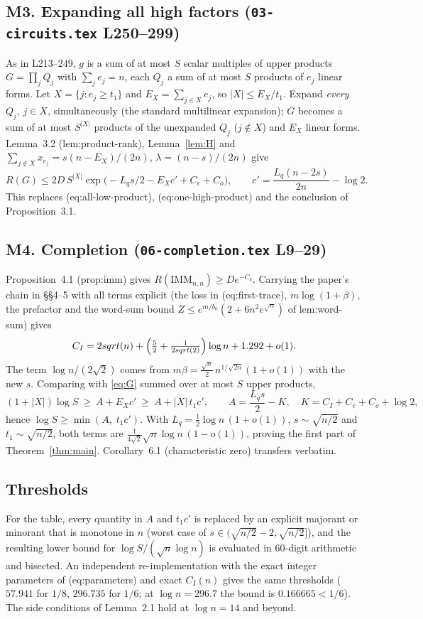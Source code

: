 \documentclass[10pt]{amsart}
\theoremstyle{remark}
\newcommand{\IMM}{\mathrm{IMM}}
\begin{document}
\subsection*{M3. Expanding all high factors (\texttt{03-circuits.tex} L250--299)}
As in L213--249, $g$ is a sum of at most $S$ scalar multiples of upper products
$G=\prod_jQ_j$ with $\sum_je_j=n$, each $Q_j$ a sum of at most $S$ products of $e_j$ linear
forms. Let $X=\{j:e_j\ge t_1\}$ and $E_X=\sum_{j\in X}e_j$, so $|X|\le E_X/t_1$. Expand
\emph{every} $Q_j$, $j\in X$, simultaneously (the standard multilinear expansion); $G$
becomes a sum of at most $S^{|X|}$ products of the unexpanded $Q_j$ ($j\notin X$) and $E_X$
linear forms. Lemma~3.2 (lem:product-rank), Lemma~\ref{lem:H} and
$\sum_{j\notin X}x_{e_j}=s(n-E_X)/(2n)$, $\lambda=(n-s)/(2n)$ give
\begin{equation}\label{eq:G}
R(G)\le 2D\,S^{|X|}\exp\bigl(-L_q s/2-E_X c'+C_e+C_o\bigr),\qquad
c'=\frac{L_q(n-2s)}{2n}-\log2 .
\end{equation}
This replaces (eq:all-low-product), (eq:one-high-product) and the conclusion of
Proposition~3.1.

\subsection*{M4. Completion (\texttt{06-completion.tex} L9--29)}
Proposition~4.1 (prop:imm) gives $R(\IMM_{n,n})\ge D e^{-C_I}$. Carrying the paper's
chain in \S\S4--5 with all terms explicit (the loss in (eq:first-trace), $m\log(1+\beta)$,
the prefactor and the word-sum bound $Z\le e^{m/b_0}(2+6n^2e^{\sqrt n})$ of
lem:word-sum) gives
\[
C_I=2\sqrt n+\Bigl(\tfrac52+\tfrac1{2\sqrt2}\Bigr)\log n+1.292+o(1).
\]
The term $\log n/(2\sqrt2)$ comes from $m\beta=\tfrac{\sqrt n}{2}\,n^{1/\sqrt{2n}}(1+o(1))$
with the new $s$. Comparing with \eqref{eq:G} summed over at most $S$ upper products,
\[
(1+|X|)\log S\ \ge\ A+E_Xc'\ \ge\ A+|X|\,t_1c',\qquad A=\frac{L_qs}{2}-K,\quad
K=C_I+C_e+C_o+\log2,
\]
hence $\log S\ge\min(A,\;t_1c')$. With $L_q=\tfrac12\log n\,(1+o(1))$,
$s\sim\sqrt{n/2}$ and $t_1\sim\sqrt{n/2}$, both terms are
$\frac{1}{4\sqrt2}\sqrt n\log n\,(1-o(1))$, proving the first part of
Theorem~\ref{thm:main}. Corollary~6.1 (characteristic zero) transfers verbatim.

\subsection*{Thresholds}
For the table, every quantity in $A$ and $t_1c'$ is replaced by an explicit majorant or
minorant that is monotone in $n$ (worst case of $s\in(\sqrt{n/2}-2,\sqrt{n/2}]$), and the
resulting lower bound for $\log S/(\sqrt n\log n)$ is evaluated in 60-digit arithmetic and
bisected. An independent re-implementation with the exact integer parameters of
(eq:parameters) and exact $C_I(n)$ gives the same thresholds ($57.941$ for $1/8$,
$296.735$ for $1/6$; at $\log n=296.7$ the bound is $0.166665<1/6$). The side conditions
of Lemma~2.1 hold at $\log n=14$ and beyond.
\end{document}

